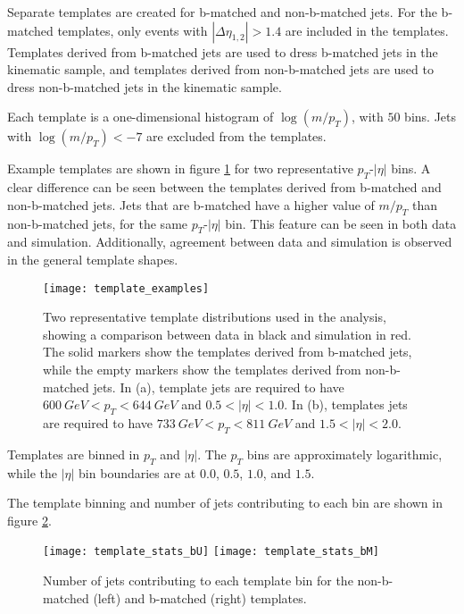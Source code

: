 Separate templates are created for b-matched and non-b-matched jets. For the b-matched templates, only events with
$|\Delta \eta_{1,2}| > 1.4$ are included in the templates. Templates
derived from b-matched jets are used to dress b-matched jets in the
kinematic sample, and templates derived from non-b-matched jets are
used to dress non-b-matched jets in the kinematic sample.

Each template is a one-dimensional histogram of $\log\left(m/p_{T}\right)$,
with $50$ bins. Jets with $\log\left(m/p_{T}\right)< -7$ are excluded
from the templates.

Example templates are shown in figure \ref{fig:template_examples} for
two representative $p_{T}$-$|\eta|$ bins. A clear difference can be
seen between the templates derived from b-matched and non-b-matched
jets. Jets that are b-matched have a higher value of $m/p_{T}$ than
non-b-matched jets, for the same  $p_{T}$-$|\eta|$ bin. This feature
can be seen in both data and simulation. Additionally,
agreement between data and simulation is observed in the general
template shapes.

\begin{figure}[h]
\texttt{[image: template\_examples]}
\caption{Two representative template distributions used in the analysis, showing a
  comparison between data in black and simulation in
  red. The solid markers show the templates derived from b-matched
  jets, while the empty markers show the templates derived from
  non-b-matched jets. In (a), template jets are required to have
  $600~GeV < p_{T} < 644~GeV$ and $0.5 <|\eta|<1.0$. In (b), templates
  jets are required to have $733~GeV < p_{T} < 811~GeV$ and $1.5<|\eta|<2.0$.}
\label{fig:template_examples}
\end{figure}

Templates are binned in $p_T$ and $|\eta|$. The $p_T$ bins are
approximately logarithmic, while the $|\eta|$ bin boundaries are at
$0.0$, $0.5$, $1.0$, and $1.5$. 

The template binning and number of jets contributing to each bin are
shown in figure \ref{fig:template_stats}.

\begin{figure}[h]
\texttt{[image: template\_stats\_bU]}
\texttt{[image: template\_stats\_bM]}
\caption{Number of jets contributing to each template bin for the
  non-b-matched (left) and b-matched (right) templates.}
\label{fig:template_stats}
\end{figure}

